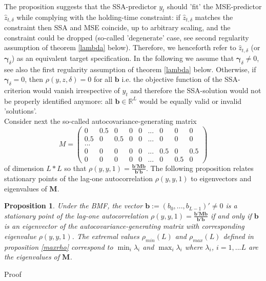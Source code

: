\documentclass[a4paper]{article}
\newtheorem{Proposition}{Proposition}
\begin{document}
The proposition suggests that the SSA-predictor $y_t$ should 'fit' the MSE-predictor $\hat{z}_{t,\delta}$ while complying with the holding-time constraint: if $\hat{z}_{t,\delta}$ matches the constraint then SSA and MSE coincide, up to arbitrary scaling, and the constraint could be dropped (so-called 'degenerate' case, see second regularity assumption of theorem \ref{lambda} below). Therefore, we henceforth refer to $\hat{z}_{t,\delta}$ (or $\boldsymbol{\gamma}_{\delta}$) as an equivalent target specification. In the following we assume that $\boldsymbol{\gamma}_{\delta}\neq 0$, see also the first regularity assumption of theorem \ref{lambda} below. Otherwise, if $\boldsymbol{\gamma}_{\delta}=0$, then $\rho(y,z,\delta)=0$ for all $\mathbf{b}$ i.e. the objective function of the SSA-criterion would vanish irrespective of $y_t$ and therefore the SSA-solution would not be properly identified anymore: all $\mathbf{b}\in \mathbb{R}^{L}$ would be equally valid or invalid 'solutions'.  \\

Consider next the so-called autocovariance-generating matrix
\[
M=\left(\begin{array}{ccccccccc}0&0.5&0&0&0&...&0&0&0\\
0.5&0&0.5&0&0&...&0&0&0\\
...&&&&&&&&\\
0&0&0&0&0&...&0.5&0&0.5\\
0&0&0&0&0&...&0&0.5&0
\end{array}\right)
\]
of dimension $L*L$ so that $\rho(y,y,1)=\displaystyle{\frac{\mathbf{b'Mb}}{\mathbf{b'b}}}$. The following proposition relates stationary points of the lag-one autocorrelation $\rho(y,y,1)$ to eigenvectors and eigenvalues of   $\mathbf{M}$. 


\begin{Proposition}\label{stationary_eigenvec}
Under the BMF, the vector $\mathbf{b}:=(b_0,...,b_{L-1})'\neq 0$ is a stationary point of the lag-one autocorrelation $\rho(y,y,1)=\displaystyle{\frac{\mathbf{b'Mb}}{\mathbf{b'b}}}$ if and only if $\mathbf{b}$ is an eigenvector of the autocovariance-generating matrix 
with corresponding eigenvalue $\rho(y,y,1)$. The extremal values $\rho_{min}(L)$ and $\rho_{max}(L)$ defined in proposition \ref{maxrho} correspond to $\min_i\lambda_i$ and $\max_i\lambda_i$ where $\lambda_i$, $i=1,...L$ are the eigenvalues of $\mathbf{M}$. 
\end{Proposition}

Proof\\
\end{document}
